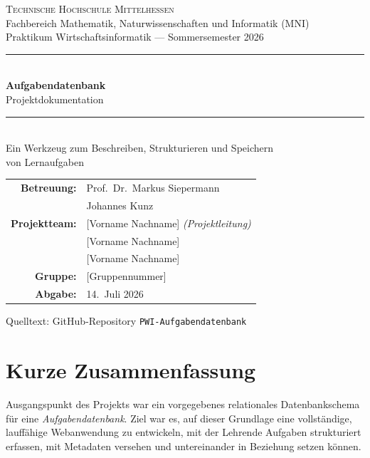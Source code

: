 \documentclass[11pt,a4paper]{article}
\begin{document}
\begin{titlepage}
\centering
\vspace*{2.2cm}
{\Large\scshape Technische Hochschule Mittelhessen}\\[2pt]
{\normalsize Fachbereich Mathematik, Naturwissenschaften und Informatik (MNI)}\\[0.4cm]
{\normalsize Praktikum Wirtschaftsinformatik --- Sommersemester 2026}\\[3.0cm]

\rule{\linewidth}{1pt}\\[8pt]
{\Huge\bfseries Aufgabendatenbank}\\[10pt]
{\LARGE Projektdokumentation}\\[8pt]
\rule{\linewidth}{1pt}\\[1.2cm]

{\large Ein Werkzeug zum Beschreiben, Strukturieren und Speichern\\von Lernaufgaben}\\[2.6cm]

\begin{tabular}{rl}
\textbf{Betreuung:} & Prof.\ Dr.\ Markus Siepermann\\
 & Johannes Kunz\\[6pt]
\textbf{Projektteam:} & [Vorname Nachname] \textit{(Projektleitung)}\\
 & [Vorname Nachname]\\
 & [Vorname Nachname]\\[6pt]
\textbf{Gruppe:} & [Gruppennummer]\\[6pt]
\textbf{Abgabe:} & 14.\ Juli 2026\\
\end{tabular}

\vfill
{\footnotesize Quelltext: GitHub-Repository \texttt{PWI-Aufgabendatenbank}}
\end{titlepage}

\tableofcontents
\newpage

\section{Kurze Zusammenfassung}

Ausgangspunkt des Projekts war ein vorgegebenes relationales Datenbankschema für
eine \emph{Aufgabendatenbank}. Ziel war es, auf dieser Grundlage eine
vollständige, lauffähige Webanwendung zu entwickeln, mit der Lehrende Aufgaben
strukturiert erfassen, mit Metadaten versehen und untereinander in Beziehung
setzen können.
\end{document}
